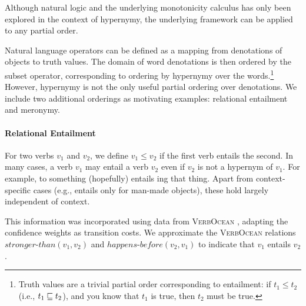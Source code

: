 Although natural logic and the underlying monotonicity calculus has 
  only been explored in the context of hypernymy, the underlying framework
  can be applied to any partial order.%

Natural language operators can be defined as a mapping from
  denotations of objects to truth values.
The domain of word denotations is then ordered by the subset operator, corresponding
  to ordering by hypernymy over the words.\footnote{
  Truth values are a trivial partial order corresponding to entailment:
  if \hbox{$t_1 \leq t_2$} 
  (i.e., \hbox{$t_1 \sqsubseteq t_2$}),
  and you know that $t_1$ is true, then $t_2$ must be true.
}
However, hypernymy is not the only useful partial ordering over denotations.
We include two additional orderings as motivating examples: relational
  entailment and meronymy.

\paragraph{Relational Entailment}
For two verbs $v_1$ and $v_2$, we define $v_1 \leq v_2$ if the first verb
  entails the second.
In many cases, a verb $v_1$ may entail a verb $v_2$ even if $v_2$ is not a hypernym of $v_1$.
For example, to  something (hopefully) entails ing that thing.
Apart from context-specific cases (e.g.,  entails  only
  for man-made objects), these hold largely independent of context.

This information was incorporated using data from \textsc{VerbOcean}
 \cite{key:2004chklovski-verbocean}, adapting the confidence weights 
 as transition costs.
We approximate the \textsc{VerbOcean} relations $\mathit{stronger\text{-}than}(v_1,v_2)$ and $\mathit{happens\text{-}before}(v_2,v_1)$ to indicate that $v_1$ entails $v_2$.

